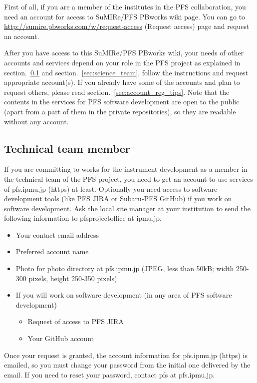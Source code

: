 \documentclass[a4paper,notitlepage]{article}
\begin{document}
First of all, if you are a member of the institutes in the PFS collaboration, 
you need an account for access to SuMIRe/PFS PBworks wiki page. 
You can go to \url{http://sumire.pbworks.com/w/request-access} (Request access) 
page and request an account. 

After you have access to this SuMIRe/PFS PBworks wiki, your needs of other 
accounts and services depend on your role in the PFS project as explained 
in section.~\ref{sec:technical_team} and section.~\ref{sec:science_team}, 
follow the instructions and request appropriate account(s). 
If you already have some of the accounts and plan to request others, 
please read section.~\ref{sec:account_reg_tips}. 
Note that the contents in the services for PFS software development are 
open to the public (apart from a part of them in the private repositories), 
so they are readable without any account. 

\subsection{Technical team member}
\label{sec:technical_team}

If you are committing to works for the instrument development as a member 
in the technical team of the PFS project, you need to get an account to use 
services of pfs.ipmu.jp (https) at least. Optionally you need access to 
software development tools (like PFS JIRA or Subaru-PFS GitHub) if you work 
on software development. Ask the local site manager at your institution 
to send the following information to pfsprojectoffice at ipmu.jp.

\begin{itemize}
  \item Your contact email address
  \item Preferred account name
  \item Photo for photo directory at pfs.ipmu.jp
    (JPEG, less than 50kB; width 250-300 pixels, height 250-350 pixels)
  \item If you will work on software development (in any area of PFS software 
    development) 
    \begin{itemize}
      \item Request of access to PFS JIRA
      \item Your GitHub account
    \end{itemize}
\end{itemize}

Once your request is granted, the account information for pfs.ipmu.jp (https) 
is emailed, so you must change your password from the initial one delivered 
by the email. If you need to reset your password, contact pfs at pfs.ipmu.jp.
\end{document}

